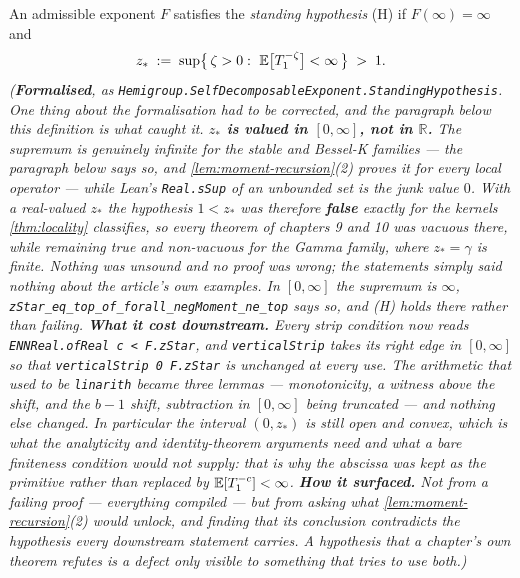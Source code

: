 \begin{definition}\label{def:standing-hypothesis}
\leanok
An admissible exponent $F$ satisfies the \emph{standing hypothesis} (H) if
$F(\infty) = \infty$ and
\[
  z_* \;:=\; \sup\bigl\{\, \zeta > 0 :\ \mathbb{E}\bigl[T_1^{-\zeta}\bigr] < \infty \,\bigr\} \;>\; 1 .
\]
\statusT\quad\emph{(\textbf{Formalised}, as
\texttt{Hemigroup.SelfDecomposableExponent.StandingHypothesis}. One thing about the formalisation
had to be corrected, and the paragraph below this definition is what caught it.
\textbf{$z_*$ is valued in $[0,\infty]$, not in $\mathbb{R}$.} The supremum is genuinely infinite
for the stable and Bessel-K families --- the paragraph below says so, and
\ref{lem:moment-recursion}(2) \emph{proves} it for every local operator --- while Lean's
\texttt{Real.sSup} of an unbounded set is the junk value $0$. With a real-valued $z_*$ the
hypothesis $1 < z_*$ was therefore \textbf{false} exactly for the kernels \ref{thm:locality}
classifies, so every theorem of chapters 9 and 10 was vacuous there, while remaining true and
non-vacuous for the Gamma family, where $z_* = \gamma$ is finite. Nothing was unsound and no proof
was wrong; the statements simply said nothing about the article's own examples. In $[0,\infty]$
the supremum is $\infty$, \texttt{zStar\_eq\_top\_of\_forall\_negMoment\_ne\_top} says so, and (H)
holds there rather than failing.
\textbf{What it cost downstream.} Every strip condition now reads
\texttt{ENNReal.ofReal c < F.zStar}, and \texttt{verticalStrip} takes its right edge in
$[0,\infty]$ so that \texttt{verticalStrip 0 F.zStar} is unchanged at every use. The arithmetic
that used to be \texttt{linarith} became three lemmas --- monotonicity, a witness above the
shift, and the $b-1$ shift, subtraction in $[0,\infty]$ being truncated --- and nothing else
changed. In particular the interval $(0,z_*)$ is still open and convex, which is what the
analyticity and identity-theorem arguments need and what a bare finiteness condition would not
supply: that is why the abscissa was kept as the primitive rather than replaced by
$\mathbb{E}[T_1^{-c}] < \infty$.
\textbf{How it surfaced.} Not from a failing proof --- everything compiled --- but from asking
what \ref{lem:moment-recursion}(2) would unlock, and finding that its conclusion contradicts the
hypothesis every downstream statement carries. A hypothesis that a chapter's own theorem refutes
is a defect only visible to something that tries to use both.)}
\end{definition}

